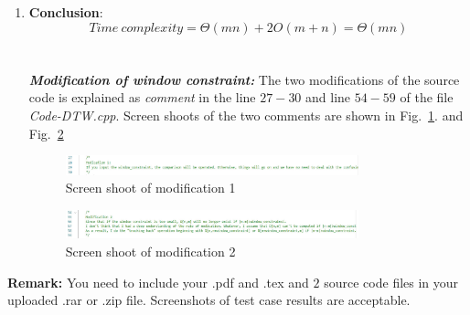 \documentclass[12pt,a4paper]{article}
\makeatletter
\newtheorem*{solution}{Solution}
\theoremstyle{definition}
\renewenvironment{solution}[1][Solution] {\par\pushQED{\qed}\normalfont\topsep6\p@\@plus6\p@\relax\trivlist\item[\hskip\labelsep\bfseries#1\@addpunct{.}]\ignorespaces}{\popQED\endtrivlist\@endpefalse} \makeatother
\makeatother
\begin{document}
\begin{enumerate}
\begin{solution}
		        \textbf{Conclusion}:
		        $$Time\ complexity=\Theta(mn)+2O(m+n)=\Theta(mn)$$
		        \\
		        \\
                \textbf{\textit{Modification of window constraint:}} 
                The two modifications of the source code is explained as \emph{comment} in the line $27-30$ and line $54-59$ of the file \emph{Code-DTW.cpp}. Screen shoots of the two comments are shown in  Fig.~\ref{Fig-Modification1}. and Fig.~\ref{Fig-Modification2}
                \begin{figure}[htbp]
                \centering 
                \includegraphics[width=0.8\textwidth]{Fig-Modification1.pdf}
                \caption{Screen shoot of modification 1}\label{Fig-Modification1}
                \end{figure}
                
                \begin{figure}[htbp]
                \centering 
                \includegraphics[width=0.8\textwidth]{Fig-Modification2.pdf}
                \caption{Screen shoot of modification 2}\label{Fig-Modification2}
                \end{figure}
		    \end{solution}
		
	\end{enumerate}
	
	\vspace{20pt}
	
	\textbf{Remark:} You need to include your .pdf and .tex and {\color{red}\emph{$2$}} source code files in your uploaded .rar or .zip file. Screenshots of test case results are acceptable.
	
\end{document}
